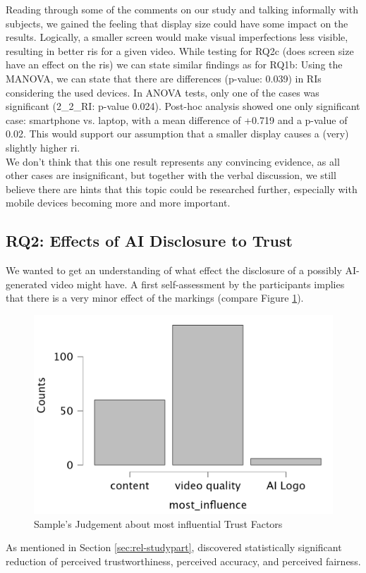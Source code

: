 \documentclass[
  a4paper,  %
  twoside,  %
  bibliography=totoc,
  headsepline,
  cleardoublepage=empty,
  parskip=half,
  draft=false
]{scrbook}
\begin{document}
Reading through some of the comments on our study and talking informally with subjects, we gained the feeling that display size could have some impact on the results. Logically, a smaller screen would make visual imperfections less visible, resulting in better \gls{ri}s for a given video. While testing for RQ2c (does screen size have an effect on the \gls{ri}s) we can state similar findings as for RQ1b: Using the MANOVA, we can state that there are differences (p-value: 0.039) in RIs considering the used devices.
In ANOVA tests, only one of the cases was significant (2\_2\_RI: p-value 0.024). Post-hoc analysis showed one only significant case: smartphone vs. laptop, with a mean difference of +0.719 and a p-value of 0.02. This would support our assumption that a smaller display causes a (very) slightly higher \gls{ri}. \\
We don't think that this one result represents any convincing evidence, as all other cases are insignificant, but together with the verbal discussion, we still believe there are hints that this topic could be researched further, especially with mobile devices becoming more and more important.

\subsection{RQ2: Effects of AI Disclosure to Trust}
\label{subsec:RQ2}
We wanted to get an understanding of what effect the disclosure of a possibly AI-generated video might have. A first self-assessment by the participants implies that there is a very minor effect of the markings (compare Figure \ref{fig:most-influence}).
\begin{figure}[h]
  \centering
  \includegraphics[width=.5\textwidth]{graphics/statistics/most-influence.png}
  \caption{Sample's Judgement about most influential Trust Factors}
  \label{fig:most-influence}
\end{figure}
As mentioned in Section \ref{sec:rel-studypart},  discovered statistically significant reduction of perceived trustworthiness, perceived accuracy, and perceived fairness. 
\end{document}
